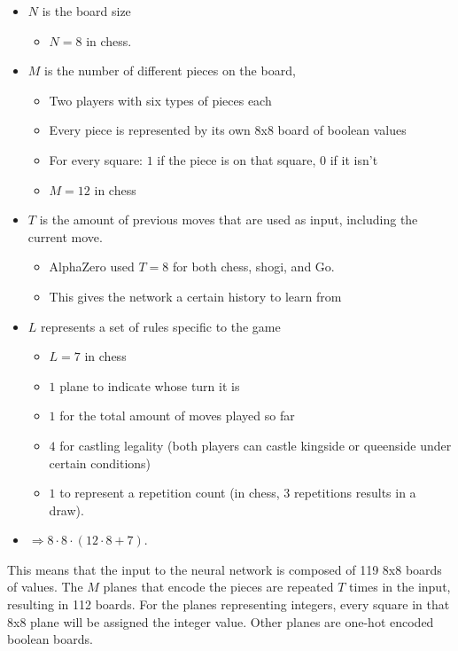 \documentclass{article}
\begin{document}
\begin{itemize}
    \item $N$ is the board size
    \begin{itemize}
        \item $N = 8$ in chess.
    \end{itemize}
    \item $M$ is the number of different pieces on the board, 
    \begin{itemize}
        \item Two players with six types of pieces each
        \item Every piece is represented by its own 8x8 board of boolean values
        \item For every square: $1$ if the piece is on that square, $0$ if it isn't
        \item $M = 12$ in chess
    \end{itemize}
    \item $T$ is the amount of previous moves that are used as input, including the current move. 
    \begin{itemize}
        \item AlphaZero used $T = 8$ for both chess, shogi, and Go.
        \item This gives the network a certain history to learn from
    \end{itemize}
    \item $L$ represents a set of rules specific to the game
    \begin{itemize}
        \item $L = 7$ in chess
        \item $1$ plane to indicate whose turn it is
        \item $1$ for the total amount of moves played so far
        \item $4$ for castling legality (both players can castle kingside or queenside under certain conditions)
        \item $1$ to represent a repetition count (in chess, 3 repetitions results in a draw). 
    \end{itemize}
    \item $\Rightarrow 8 \cdot 8 \cdot (12 \cdot 8 + 7)$. 
\end{itemize}

This means that the input to the neural network is composed of 119 8x8 boards of values.
The $M$ planes that encode the pieces are repeated $T$ times in the input, resulting in 112 boards.
For the planes representing integers, every square in that 8x8 plane will be assigned the integer value.
Other planes are one-hot encoded boolean boards.
\end{document}
